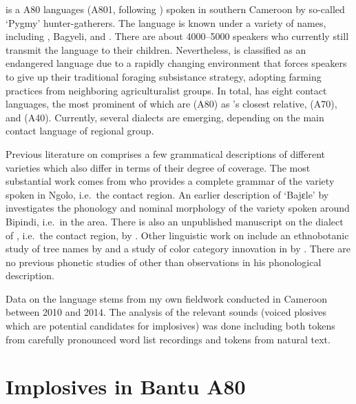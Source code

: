 \documentclass[output=paper]{LSP/langsci}
\begin{document}
 is a  A80 languages (A801, following \citealt{Maho2009}) spoken in southern Cameroon by so-called `Pygmy' hunter-gatherers. The language is known under a variety of names, including , Bagyeli, and .  There are about 4000--5000 speakers who currently still transmit the language to their children. Nevertheless,  is classified as an endangered language due to a rapidly changing environment that forces speakers to give up their traditional foraging subsistance strategy, adopting farming practices from neighboring agriculturalist  groups. In total,  has eight contact languages, the most prominent of which are  (A80) as 's closest relative,  (A70), and   (A40).  Currently, several  dialects are emerging, depending on the main contact language of regional  group.

Previous literature on  comprises a few grammatical descriptions of different  varieties which also differ in terms of their degree of coverage. The most substantial work comes from \citet{Grimm2015} who provides a complete grammar of the variety spoken in Ngolo, i.e.\ the  contact region. An earlier description of `Bajɛle' by \citet{Renaud1976} investigates the phonology and nominal morphology of the  variety spoken around Bipindi, i.e.\ in the  area. There is also an unpublished manuscript on the dialect of , i.e.\ the  contact region, by \citet{NgueUm2012}. Other linguistic work on  include an ethnobotanic study of tree names by \citet{Letouzey1995} and a study of color category innovation in  by \citet{Grimm2014}. There are no previous phonetic studies of  other than  observations in his phonological description.

Data on the  language stems from my own fieldwork conducted in Cameroon between 2010 and 2014. The analysis of the relevant sounds (voiced plosives which are potential candidates for implosives) was done including both tokens from carefully pronounced word list recordings and tokens from natural text.







\section{Implosives in Bantu A80}
\label{sec:grimm:2}
\end{document}
